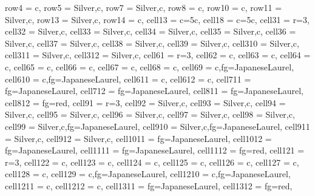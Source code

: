 \begin{table}[H]
    \centering
    \begin{tblr}{
            row{4} = {c},
            row{5} = {Silver,c},
            row{7} = {Silver,c},
            row{8} = {c},
            row{10} = {c},
            row{11} = {Silver,c},
            row{13} = {Silver,c},
            row{14} = {c},
            cell{1}{3} = {c=5}{c},
            cell{1}{8} = {c=5}{c},
            cell{3}{1} = {r=3}{},
            cell{3}{2} = {Silver,c},
            cell{3}{3} = {Silver,c},
            cell{3}{4} = {Silver,c},
            cell{3}{5} = {Silver,c},
            cell{3}{6} = {Silver,c},
            cell{3}{7} = {Silver,c},
            cell{3}{8} = {Silver,c},
            cell{3}{9} = {Silver,c},
            cell{3}{10} = {Silver,c},
            cell{3}{11} = {Silver,c},
            cell{3}{12} = {Silver,c},
            cell{6}{1} = {r=3}{},
            cell{6}{2} = {c},
            cell{6}{3} = {c},
            cell{6}{4} = {c},
            cell{6}{5} = {c},
            cell{6}{6} = {c},
            cell{6}{7} = {c},
            cell{6}{8} = {c},
            cell{6}{9} = {c,fg=JapaneseLaurel},
            cell{6}{10} = {c,fg=JapaneseLaurel},
            cell{6}{11} = {c},
            cell{6}{12} = {c},
            cell{7}{11} = {fg=JapaneseLaurel},
            cell{7}{12} = {fg=JapaneseLaurel},
            cell{8}{11} = {fg=JapaneseLaurel},
            cell{8}{12} = {fg=red},
            cell{9}{1} = {r=3}{},
            cell{9}{2} = {Silver,c},
            cell{9}{3} = {Silver,c},
            cell{9}{4} = {Silver,c},
            cell{9}{5} = {Silver,c},
            cell{9}{6} = {Silver,c},
            cell{9}{7} = {Silver,c},
            cell{9}{8} = {Silver,c},
            cell{9}{9} = {Silver,c,fg=JapaneseLaurel},
            cell{9}{10} = {Silver,c,fg=JapaneseLaurel},
            cell{9}{11} = {Silver,c},
            cell{9}{12} = {Silver,c},
            cell{10}{11} = {fg=JapaneseLaurel},
            cell{10}{12} = {fg=JapaneseLaurel},
            cell{11}{11} = {fg=JapaneseLaurel},
            cell{11}{12} = {fg=red},
            cell{12}{1} = {r=3}{},
            cell{12}{2} = {c},
            cell{12}{3} = {c},
            cell{12}{4} = {c},
            cell{12}{5} = {c},
            cell{12}{6} = {c},
            cell{12}{7} = {c},
            cell{12}{8} = {c},
            cell{12}{9} = {c,fg=JapaneseLaurel},
            cell{12}{10} = {c,fg=JapaneseLaurel},
            cell{12}{11} = {c},
            cell{12}{12} = {c},
            cell{13}{11} = {fg=JapaneseLaurel},
            cell{13}{12} = {fg=red},
}
\end{tblr}
\end{table}

